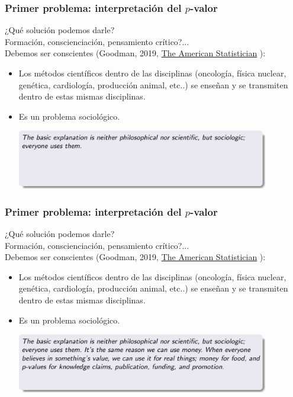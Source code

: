 \documentclass[9pt]{beamer}
\begin{document}
\begin{frame}
  \frametitle{Primer problema: interpretación del $p$-valor}
    \begin{overlayarea}{\textwidth}{0.8\textheight}
  ¿Qué solución podemos darle?\\
  \onslide<+->
  Formación, conscienciación, pensamiento crítico?...\\
  \onslide<+->
  Debemos ser conscientes (Goodman,
  2019, \href{https://doi.org/10.1080/00031305.2018.1558111}{The American Statistician} ):
  \begin{itemize}
  \item<+-> Los métodos científicos dentro de las disciplinas
    (oncología, física nuclear, genética, cardiología, producción
    animal, etc..) se enseñan y se transmiten dentro de estas mismas
    disciplinas. 
  \item<+-> Es un problema sociológico. \onslide<+->
    \begin{center}
      \includegraphics[width=11cm]{images/goodman_1}
    \end{center}
  \end{itemize}
  
\end{overlayarea}
\end{frame}
\begin{frame}
  \frametitle{Primer problema: interpretación del $p$-valor}
    \begin{overlayarea}{\textwidth}{0.8\textheight}
  ¿Qué solución podemos darle?\\ 
  Formación, conscienciación, pensamiento crítico?...\\
  Debemos ser conscientes (Goodman,
  2019, \href{https://doi.org/10.1080/00031305.2018.1558111}{The American Statistician} ):
  \begin{itemize}
  \item Los métodos científicos dentro de las disciplinas
    (oncología, física nuclear, genética, cardiología, producción
    animal, etc..) se enseñan y se transmiten dentro de estas mismas
    disciplinas. 
  \item Es un problema sociológico. 
    \begin{center}
      \includegraphics[width=11cm]{images/goodman_2}
    \end{center}
  \end{itemize}
  
\end{overlayarea}
\end{frame}
\end{document}
